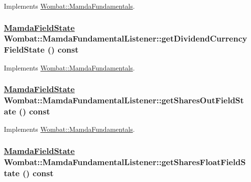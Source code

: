 Implements \hyperlink{classWombat_1_1MamdaFundamentals_d08e80fd98352ba7eaa5beafaaad9d55}{Wombat::Mamda\-Fundamentals}.\hypertarget{classWombat_1_1MamdaFundamentalListener_e30b3e82e42b4477de977764592731ee}{
\subsubsection[getDividendCurrencyFieldState]{\setlength{\rightskip}{0pt plus 5cm}\hyperlink{namespaceWombat_93aac974f2ab713554fd12a1fa3b7d2a}{Mamda\-Field\-State} Wombat::Mamda\-Fundamental\-Listener::get\-Dividend\-Currency\-Field\-State () const}}
\label{classWombat_1_1MamdaFundamentalListener_e30b3e82e42b4477de977764592731ee}




Implements \hyperlink{classWombat_1_1MamdaFundamentals_a4d435932821fbb0f1e9eb9da90c47cc}{Wombat::Mamda\-Fundamentals}.\hypertarget{classWombat_1_1MamdaFundamentalListener_0115bc828235b93375c1c3a53d8bada9}{
\subsubsection[getSharesOutFieldState]{\setlength{\rightskip}{0pt plus 5cm}\hyperlink{namespaceWombat_93aac974f2ab713554fd12a1fa3b7d2a}{Mamda\-Field\-State} Wombat::Mamda\-Fundamental\-Listener::get\-Shares\-Out\-Field\-State () const}}
\label{classWombat_1_1MamdaFundamentalListener_0115bc828235b93375c1c3a53d8bada9}




Implements \hyperlink{classWombat_1_1MamdaFundamentals_3e81462fdbe5d194b64656ad44d98711}{Wombat::Mamda\-Fundamentals}.\hypertarget{classWombat_1_1MamdaFundamentalListener_936931460f7e4cb720e366b5a4eab60f}{
\subsubsection[getSharesFloatFieldState]{\setlength{\rightskip}{0pt plus 5cm}\hyperlink{namespaceWombat_93aac974f2ab713554fd12a1fa3b7d2a}{Mamda\-Field\-State} Wombat::Mamda\-Fundamental\-Listener::get\-Shares\-Float\-Field\-State () const}}
\label{classWombat_1_1MamdaFundamentalListener_936931460f7e4cb720e366b5a4eab60f}




